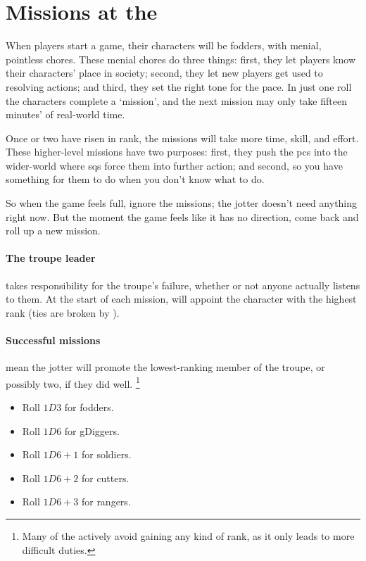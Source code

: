 \setCycle{\month}{\day}

\section{Missions at the }
\label{NGmissions}

\begin{multicols}{2}

\noindent
When players start a game, their characters will be \glspl{fodder}, with menial, pointless chores.
These menial chores do three things: first, they let players know their characters' place in society; second, they let new players get used to resolving actions; and third, they set the right tone for the pace.
In just one roll the characters complete a `mission', and the next mission may only take fifteen minutes' of real-world time.

Once  or two have risen in rank, the missions will take more time, skill, and effort.
These higher-level missions have two purposes: first, they push the \glspl{pc} into the wider-world where \glspl{sq} force them into further action; and second, so you have something for them to do when you don't know what to do.

So when the game feels full, ignore the missions; the \gls{jotter} doesn't need anything right now.
But the moment the game feels like it has no direction, come back and roll up a new mission.

\paragraph{The troupe leader}
takes responsibility for the troupe's failure, whether or not anyone actually listens to them.
At the start of each mission,  will appoint the character with the highest rank (ties are broken by ).

\paragraph{Successful missions}
mean the \gls{jotter} will promote the lowest-ranking member of the troupe, or possibly two, if they did well.%
\footnote{Many of the  actively avoid gaining any kind of rank, as it only leads to more difficult duties.}

\begin{itemize}
  \item
  Roll $1D3$ for \glspl{fodder}.
  \item
  Roll $1D6$ for \glspl{gDigger}.
  \item
  Roll $1D6+1$ for \glspl{soldier}.
  \item
  Roll $1D6+2$ for \glspl{cutter}.
  \item
  Roll $1D6+3$ for \glspl{ranger}.
\end{itemize}


\end{multicols}
